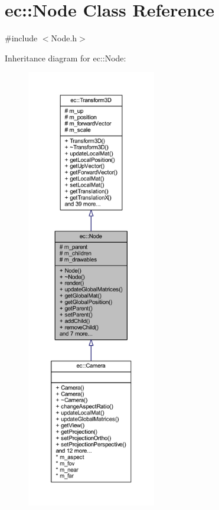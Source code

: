 \hypertarget{classec_1_1_node}{}\section{ec\+:\+:Node Class Reference}
\label{classec_1_1_node}


{\ttfamily \#include $<$Node.\+h$>$}



Inheritance diagram for ec\+:\+:Node\+:\nopagebreak
\begin{figure}[H]
\begin{center}
\leavevmode
\includegraphics[height=550pt]{classec_1_1_node__inherit__graph}
\end{center}
\end{figure}


